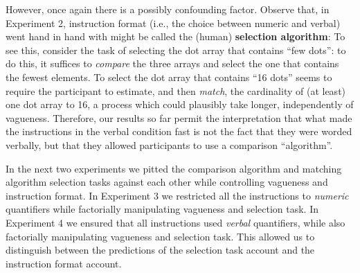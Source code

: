 However, once again there is a possibly confounding factor. Observe that, in Experiment 2, instruction format (i.e., the choice between numeric and verbal) went hand in hand with might be called the (human) {\bf selection algorithm}: To see this, consider the task of selecting the dot array that contains ``few dots'': to do this, it suffices to {\em compare} the three arrays and select the one that contains the fewest elements.  To select the dot array that contains ``16 dots'' seems to require the participant to estimate, and then {\em match}, the cardinality of (at least) one dot array to 16, a process which could plausibly take longer, independently of vagueness. Therefore, our results so far permit the interpretation that what made the instructions in the verbal condition fast is not the fact that they were worded verbally, but that they allowed participants to use a comparison ``algorithm''.

In the next two experiments we pitted the comparison algorithm and matching algorithm selection tasks against each other while controlling vagueness and instruction format. In Experiment 3 we restricted all the instructions to \emph{numeric} quantifiers while factorially manipulating vagueness and selection task. In Experiment 4 we ensured that all instructions used \emph{verbal} quantifiers, while also factorially manipulating vagueness and selection task. This allowed us to distinguish between the predictions of the selection task account and the instruction format account. 

